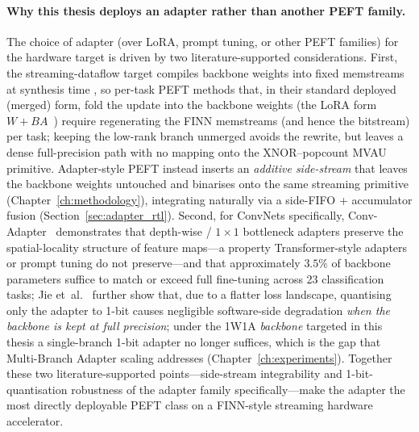 \documentclass[12pt, a4paper]{report}
\numberwithin{equation}{chapter}
\numberwithin{figure}{chapter}
\numberwithin{table}{chapter}
\numberwithin{algorithm}{chapter}
\begin{document}
\paragraph{Why this thesis deploys an adapter rather than another PEFT family.}
The choice of adapter (over LoRA, prompt tuning, or other PEFT families) for the hardware target is driven by two literature-supported considerations. First, the streaming-dataflow target compiles backbone weights into fixed memstreams at synthesis time \cite{Umuroglu2017FINN, Blott2018FINNR}, so per-task PEFT methods that, in their standard deployed (merged) form, fold the update into the backbone weights (the LoRA form $W + BA$~\cite{Hu2022LoRA, Ding2024LoRAC, Kwak2025LoRAEdge}) require regenerating the FINN memstreams (and hence the bitstream) per task; keeping the low-rank branch unmerged avoids the rewrite, but leaves a dense full-precision path with no mapping onto the XNOR--popcount MVAU primitive. Adapter-style PEFT instead inserts an \emph{additive side-stream} that leaves the backbone weights untouched and binarises onto the same streaming primitive (Chapter~\ref{ch:methodology}), integrating naturally via a side-FIFO + accumulator fusion (Section~\ref{sec:adapter_rtl}). Second, for ConvNets specifically, Conv-Adapter~\cite{Chen2024ConvAdapter} demonstrates that depth-wise / $1{\times}1$ bottleneck adapters preserve the spatial-locality structure of feature maps---a property Transformer-style adapters or prompt tuning do not preserve---and that approximately $3.5\%$ of backbone parameters suffice to match or exceed full fine-tuning across 23 classification tasks; Jie et~al.~\cite{Jie2023PrecisionRedundancy} further show that, due to a flatter loss landscape, quantising only the adapter to 1-bit causes negligible software-side degradation \emph{when the backbone is kept at full precision}; under the 1W1A \emph{backbone} targeted in this thesis a single-branch 1-bit adapter no longer suffices, which is the gap that Multi-Branch Adapter scaling addresses (Chapter~\ref{ch:experiments}). Together these two literature-supported points---side-stream integrability and 1-bit-quantisation robustness of the adapter family specifically---make the adapter the most directly deployable PEFT class on a FINN-style streaming hardware accelerator.
\end{document}
